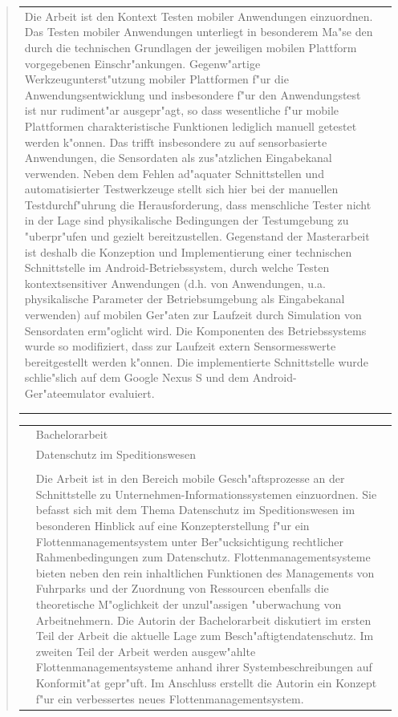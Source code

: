 \begin{quote}
\begin{tabular}{p{4cm}l}
\begin{minipage}{10cm}
		Die Arbeit ist den Kontext Testen mobiler Anwendungen einzuordnen. Das Testen mobiler Anwendungen unterliegt in besonderem Ma"se den durch die technischen Grundlagen der jeweiligen mobilen Plattform vorgegebenen Einschr"ankungen. Gegenw"artige Werkzeugunterst"utzung mobiler Plattformen f"ur die Anwendungsentwicklung und insbesondere f"ur den Anwendungstest ist nur rudiment"ar ausgepr"agt, so dass wesentliche f"ur mobile Plattformen charakteristische Funktionen lediglich manuell getestet werden k"onnen. Das trifft insbesondere zu auf sensorbasierte Anwendungen, die Sensordaten als zus"atzlichen Eingabekanal verwenden. Neben dem Fehlen ad"aquater Schnittstellen und automatisierter Testwerkzeuge stellt sich hier bei der manuellen Testdurchf"uhrung die Herausforderung, dass menschliche Tester nicht in der Lage sind physikalische Bedingungen der Testumgebung zu "uberpr"ufen und gezielt bereitzustellen. Gegenstand der  Masterarbeit ist deshalb die Konzeption und Implementierung einer technischen Schnittstelle im Android-Betriebssystem, durch welche Testen kontextsensitiver Anwendungen (d.h. von Anwendungen, u.a. physikalische Parameter der Betriebsumgebung als Eingabekanal verwenden) auf mobilen Ger"aten zur Laufzeit durch Simulation von Sensordaten erm"oglicht wird. Die Komponenten des Betriebssystems wurde so modifiziert, dass zur Laufzeit extern Sensormesswerte bereitgestellt werden k"onnen. Die implementierte Schnittstelle wurde schlie"slich auf dem Google Nexus S und dem Android-Ger"ateemulator evaluiert.
		\end{minipage}\\\\\\
	\end{tabular}
%
	\begin{tabular}{p{4cm}l}
		&Bachelorarbeit\\
		&\qquad Datenschutz im Speditionswesen\\\\
		&\begin{minipage}{10cm}
		Die Arbeit ist in den Bereich mobile Gesch"aftsprozesse an der Schnittstelle zu Unternehmen-Informationssystemen einzuordnen. Sie befasst sich mit dem Thema Datenschutz im Speditionswesen im besonderen Hinblick auf eine Konzepterstellung f"ur ein Flottenmanagementsystem unter Ber"ucksichtigung rechtlicher Rahmenbedingungen zum Datenschutz. Flottenmanagementsysteme bieten neben den rein inhaltlichen Funktionen des Managements von Fuhrparks und der Zuordnung von Ressourcen ebenfalls die theoretische M"oglichkeit der unzul"assigen "uberwachung von Arbeitnehmern. Die Autorin der Bachelorarbeit diskutiert im ersten Teil der Arbeit die aktuelle Lage zum Besch"aftigtendatenschutz. Im zweiten Teil der Arbeit werden ausgew"ahlte Flottenmanagementsysteme anhand ihrer Systembeschreibungen auf Konformit"at gepr"uft. Im Anschluss erstellt die Autorin ein Konzept f"ur ein verbessertes neues Flottenmanagementsystem.

\end{minipage}
\end{tabular}
\end{quote}

